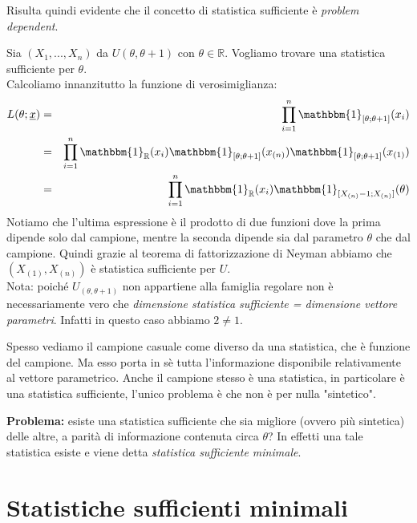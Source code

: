 Risulta quindi evidente che il concetto di statistica sufficiente è \emph{problem dependent}.
\\
\begin{esempio} Sia $(X_1,...,X_n)$ da $U(\theta, \theta +1)$ con $\theta \in \mathbb{R}$. Vogliamo trovare una statistica sufficiente per $\theta$.\\
Calcoliamo innanzitutto la funzione di verosimiglianza:
\begin{eqnarray}
L(\theta;\underline{x}) &=& \displaystyle\prod_{i=1}^n \mathbbm{1}_{[\theta; \theta +1]}(x_i)\\
&=& \displaystyle\prod_{i=1}^n \mathbbm{1}_{\mathbb{R}}(x_i) \mathbbm{1}_{[\theta; \theta +1]}(x_{(n)}) \mathbbm{1}_{[\theta; \theta +1]}(x_{(1)})\\
&=& \displaystyle\prod_{i=1}^n \mathbbm{1}_{\mathbb{R}}(x_i) \mathbbm{1}_{[X_{(n)}-1; X_{(n)}]}(\theta)
\end{eqnarray}
Notiamo che l'ultima espressione è il prodotto di due funzioni dove la prima dipende solo dal campione, mentre la seconda dipende sia dal parametro $\theta$ che dal campione. Quindi grazie al teorema di fattorizzazione di Neyman abbiamo che $(X_{(1)},X_{(n)})$ è statistica sufficiente per $U$.\\
Nota: poiché $U_{(\theta, \theta +1)}$ non appartiene alla famiglia regolare non è necessariamente vero che \emph{dimensione statistica sufficiente = dimensione vettore parametri}. Infatti in questo caso abbiamo $2 \neq 1$.
\end{esempio}

\begin{oss} Spesso vediamo il campione casuale come diverso da una statistica, che è funzione del campione. Ma esso porta in sè tutta l'informazione disponibile relativamente al vettore parametrico. Anche il campione stesso è una statistica, in particolare è una statistica sufficiente, l'unico problema è che non è per nulla "sintetico".
\end{oss}

\textbf{Problema:} esiste una statistica sufficiente che sia migliore (ovvero più sintetica) delle altre, a parità di informazione contenuta circa $\theta$? In effetti una tale statistica esiste e viene detta \textit{statistica sufficiente minimale}.


\section{Statistiche sufficienti minimali}

